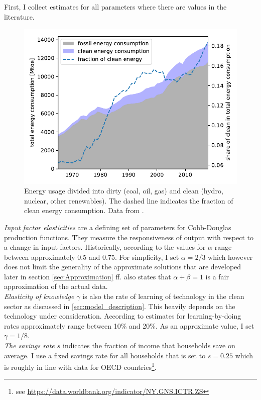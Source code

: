 First, I collect estimates for all parameters where there are values in the literature.\\

\begin{figure}
	\vspace{-.4 cm}
        \hspace{-1.5 cm}
        \includegraphics[width = .65 \textwidth]{./figures/energy_consumption_clean_dirty.pdf}
        \caption{Energy usage divided into dirty (coal, oil, gas) and clean (hydro, nuclear, other renewables). The dashed line indicates the fraction of clean energy consumption. Data from \cite{dudley2019bp}.\label{fig:energy_data}}
\end{figure}
\textit{Input factor elasticities} are a defining set of parameters for Cobb-Douglas production functions. They measure the responsiveness of output with respect to a change in input factors. Historically, according to \cite{Douglas1976} the values for $\alpha$ range between approximately 0.5 and 0.75. For simplicity, I set $\alpha=2/3$ which however does not limit the generality of the approximate solutions that are developed later in section \ref{sec:Approximation} ff. \cite{Douglas1976} also states that $\alpha+\beta=1$ is a fair approximation of the actual data.\\
\textit{Elasticity of knowledge $\gamma$} is also the rate of learning of technology in the clean sector as discussed in \ref{sec:model_description}. This heavily depends on the technology under consideration. According to \cite{Kahouli-Brahmi2008} estimates for learning-by-doing rates approximately range between 10\% and 20\%. As an approximate value, I set $\gamma=1/8$. \\
\textit{The savings rate $s$} indicates the fraction of income that households save on average. I use a fixed savings rate for all households that is set to $s=0.25$ which is roughly in line with data for OECD countries\footnote{see \url{https://data.worldbank.org/indicator/NY.GNS.ICTR.ZS}}.\\
